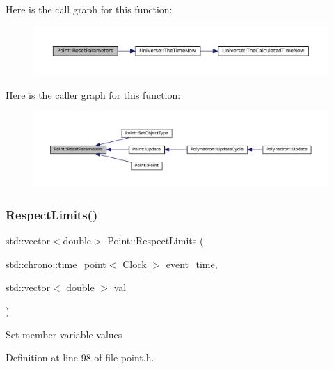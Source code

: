 Here is the call graph for this function\+:\nopagebreak
\begin{figure}[H]
\begin{center}
\leavevmode
\includegraphics[width=350pt]{class_point_a123c78bef71f74d71bc833709a38709c_cgraph}
\end{center}
\end{figure}
Here is the caller graph for this function\+:\nopagebreak
\begin{figure}[H]
\begin{center}
\leavevmode
\includegraphics[width=350pt]{class_point_a123c78bef71f74d71bc833709a38709c_icgraph}
\end{center}
\end{figure}
\mbox{\label{class_point_ac3e94cb7e2ab1d6008ff1d5df00641c2}} 
\subsubsection{\texorpdfstring{Respect\+Limits()}{RespectLimits()}}
{\footnotesize\ttfamily std\+::vector$<$double$>$ Point\+::\+Respect\+Limits (\begin{DoxyParamCaption}\item[{std\+::chrono\+::time\+\_\+point$<$ \mbox{\hyperlink{universe_8h_a0ef8d951d1ca5ab3cfaf7ab4c7a6fd80}{Clock}} $>$}]{event\+\_\+time,  }\item[{std\+::vector$<$ double $>$}]{val }\end{DoxyParamCaption})\hspace{0.3cm}{\ttfamily [inline]}}

Set member variable values 

Definition at line 98 of file point.\+h.

